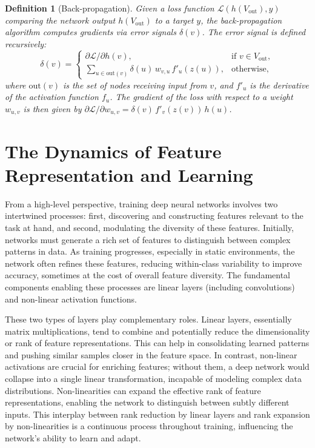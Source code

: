 \documentclass{article}
\newcommand{\Loss}{\mathcal{L}}
\newtheorem{definition}{Definition}[section]
\begin{document}
\begin{definition}[Back-propagation]
Given a loss function $\Loss(h(V_{\text{out}}),y)$ comparing the network output $h(V_{\text{out}})$ to a target $y$, the back-propagation algorithm computes gradients via error signals $\delta(v)$. The error signal is defined recursively:
\[
\delta(v)=
\begin{cases}
\partial\Loss/\partial h(v), & \text{if } v\in V_{\text{out}},\\[4pt]
\displaystyle\sum_{u\in\mathrm{out}(v)}\delta(u)\,w_{v,u}\,f'_u(z(u)), &\text{otherwise}, %
\end{cases}
\]
where $\mathrm{out}(v)$ is the set of nodes receiving input from $v$, and $f'_u$ is the derivative of the activation function $f_u$. The gradient of the loss with respect to a weight $w_{u,v}$ is then given by $\partial\Loss/\partial w_{u,v}=\delta(v)\,f'_v(z(v))\,h(u)$.
\end{definition}

\section{The Dynamics of Feature Representation and Learning}
\label{sec:feature_dynamics}

From a high-level perspective, training deep neural networks involves two intertwined processes: first, discovering and constructing features relevant to the task at hand, and second, modulating the diversity of these features. Initially, networks must generate a rich set of features to distinguish between complex patterns in data. As training progresses, especially in static environments, the network often refines these features, reducing within-class variability to improve accuracy, sometimes at the cost of overall feature diversity. The fundamental components enabling these processes are linear layers (including convolutions) and non-linear activation functions.

These two types of layers play complementary roles. Linear layers, essentially matrix multiplications, tend to combine and potentially reduce the dimensionality or rank of feature representations. This can help in consolidating learned patterns and pushing similar samples closer in the feature space. In contrast, non-linear activations are crucial for enriching features; without them, a deep network would collapse into a single linear transformation, incapable of modeling complex data distributions. Non-linearities can expand the effective rank of feature representations, enabling the network to distinguish between subtly different inputs. This interplay between rank reduction by linear layers and rank expansion by non-linearities is a continuous process throughout training, influencing the network's ability to learn and adapt.
\end{document}

